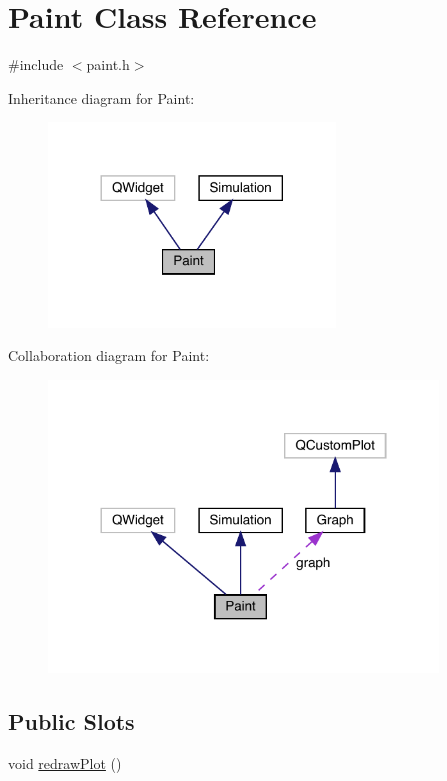 \hypertarget{classPaint}{}\section{Paint Class Reference}
\label{classPaint}


{\ttfamily \#include $<$paint.\+h$>$}



Inheritance diagram for Paint\+:\nopagebreak
\begin{figure}[H]
\begin{center}
\leavevmode
\includegraphics[width=216pt]{classPaint__inherit__graph}
\end{center}
\end{figure}


Collaboration diagram for Paint\+:\nopagebreak
\begin{figure}[H]
\begin{center}
\leavevmode
\includegraphics[width=293pt]{classPaint__coll__graph}
\end{center}
\end{figure}
\subsection*{Public Slots}
\begin{DoxyCompactItemize}
\item 
void \mbox{\hyperlink{classPaint_a9790e137dfd6386ed72aea47f176326d}{redraw\+Plot}} ()
\end{DoxyCompactItemize}
